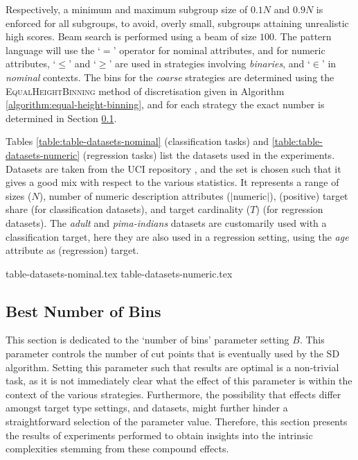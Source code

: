 \documentclass[smallextended]{svjour3}
\newcommand{\attribute}{\emph}
\newcommand{\dataset}{\emph}
\newcommand{\op}[1]{`$#1$'}
\newcommand{\parameter}{\emph}
\newcommand{\binaries}{\parameter{binaries}}
\newcommand{\nominal}{\parameter{nominal}}
\newcommand{\coarse}{\parameter{coarse}}
\newcommand{\sd}{SD}
\newcommand{\eh}{\textsc{EqualHeightBinning}}
\begin{document}
Respectively, a minimum and maximum subgroup size of $0.1 N$ and $0.9 N$ is enforced for all subgroups, to avoid, overly small, subgroups attaining unrealistic high scores.
Beam search is performed using a beam of size $100$.
The pattern language will use the \op{=} operator for nominal attributes, and for numeric attributes, \op{\leq} and \op{\geq} are used in strategies involving \binaries{}, and \op{\in} in \nominal{} contexts.
The bins for the \coarse{} strategies are determined using the \eh{} method of discretisation given in Algorithm \ref{algorithm:equal-height-binning}, and for each strategy the exact number is determined in Section \ref{section:best-number-of-bins}.

Tables \ref{table:table-datasets-nominal} (classification tasks) and \ref{table:table-datasets-numeric} (regression tasks) list the datasets used in the experiments.
Datasets are taken from the UCI repository \cite{uci}, and the set is chosen such that it gives a good mix with respect to the various statistics.
It represents a range of sizes ($N$), number of numeric description attributes ($|$numeric$|$), (positive) target share (for classification datasets), and target cardinality ($T$) (for regression datasets).
The \dataset{adult} and \dataset{pima-indians} datasets are customarily used with a classification target, here they are also used in a regression setting, using the \attribute{age} attribute as (regression) target.

{table-datasets-nominal.tex}
{table-datasets-numeric.tex}



\subsection{Best Number of Bins}
\label{section:best-number-of-bins}

This section is dedicated to the `number of bins' parameter setting $B$.
This parameter controls the number of cut points that is eventually used by the \sd{} algorithm.
Setting this parameter such that results are optimal is a non-trivial task, as it is not immediately clear what the effect of this parameter is within the context of the various strategies.
Furthermore, the possibility that effects differ amongst target type settings, and datasets, might further hinder a straightforward selection of the parameter value.
Therefore, this section presents the results of experiments performed to obtain insights into the intrinsic complexities stemming from these compound effects.
\end{document}
